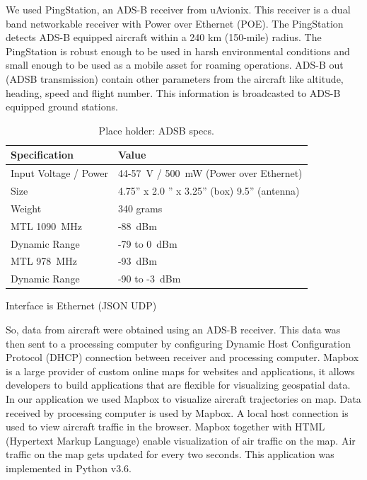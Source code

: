 \documentclass[sensors,review,submit,moreauthors,pdftex,10pt,a4paper]{mdpi}
\theoremstyle{mdpi}
\newcounter{ex}
\newcounter{re}
\theoremstyle{mdpidefinition}
\begin{document}
We used PingStation, an ADS-B receiver from uAvionix. This receiver is a dual band networkable receiver with Power over Ethernet (POE).  The PingStation detects ADS-B equipped aircraft within a 240 km (150-mile) radius. The PingStation is robust enough to be used in harsh environmental conditions and small enough to be used as a mobile asset for roaming operations. ADS-B out (ADSB transmission) contain other parameters from the aircraft like altitude, heading, speed and flight number. This information is broadcasted to ADS-B equipped ground stations.

\begin{table}[H]
\caption{\label{tab:ADSB} Place holder: ADSB specs.}
\small %
\centering
\begin{tabular}{ll}
\toprule
\textbf{Specification}	& \textbf{Value}\\
\midrule
Input Voltage / Power	&44-57~V / 500~mW (Power over Ethernet)\\
Size					& 4.75'' x 2.0 '' x 3.25'' (box) 9.5'' (antenna)\\
Weight					& 340 grams\\
MTL 1090~MHz			& -88~dBm\\
Dynamic Range			& -79 to 0~dBm\\
MTL 978~MHz				& -93~dBm\\
Dynamic Range			& -90 to -3~dBm\\
\bottomrule
\end{tabular}
\end{table}

Interface is Ethernet (JSON UDP)

So, data from aircraft were obtained using an ADS-B receiver. This data was then sent to a processing computer by configuring Dynamic Host Configuration Protocol (DHCP) connection between receiver and processing computer. Mapbox is a large provider of custom online maps for websites and applications, it allows developers to build applications that are flexible for visualizing geospatial data.  In our application we used Mapbox to visualize aircraft trajectories on map. Data received by processing computer is used by Mapbox. A local host connection is used to view aircraft traffic in the browser. Mapbox together with HTML (Hypertext Markup Language) enable visualization of air traffic on the map. Air traffic on the map gets updated for every two seconds. This application was implemented in Python v3.6.
\end{document}
